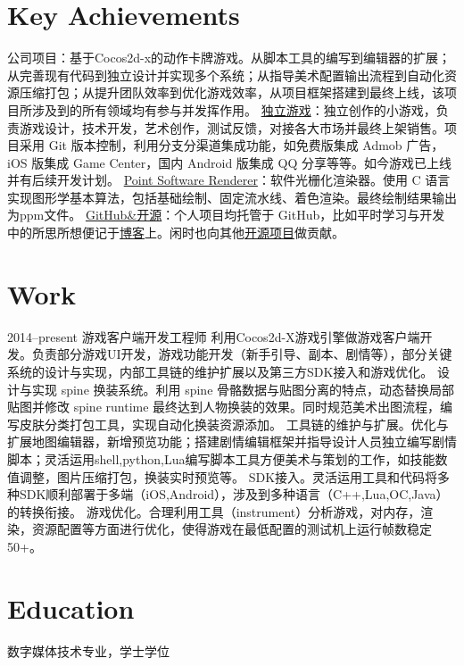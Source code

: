 \documentclass[full]{rvca}
\begin{document}
\section{Key Achievements}

\achievements
{公司项目：基于Cocos2d-x的动作卡牌游戏。从脚本工具的编写到编辑器的扩展；从完善现有代码到独立设计并实现多个系统；从指导美术配置输出流程到自动化资源压缩打包；从提升团队效率到优化游戏效率，从项目框架搭建到最终上线，该项目所涉及到的所有领域均有参与并发挥作用。}
{\href{http://a.app.qq.com/o/simple.jsp?pkgname=com.kode.Thirteen}{独立游戏}：独立创作的小游戏，负责游戏设计，技术开发，艺术创作，测试反馈，对接各大市场并最终上架销售。项目采用 Git 版本控制，利用分支分渠道集成功能，如免费版集成 Admob 广告，iOS 版集成 Game Center，国内 Android 版集成 QQ 分享等等。如今游戏已上线并有后续开发计划。}
{\href{https://github.com/keyring/point}{Point Software Renderer}：软件光栅化渲染器。使用 C 语言实现图形学基本算法，包括基础绘制、固定流水线、着色渲染。最终绘制结果输出为ppm文件。}
{\href{http://github.com/keyring}{GitHub\&开源}：个人项目均托管于 GitHub，比如平时学习与开发中的所思所想便记于\href{http://www.photoneray.com}{博客}上。闲时也向其他\href{https://github.com/cloudwu/lua53doc/graphs/contributors}{开源项目}做贡献。}
{}

\section{Work}


{2014--present}%
{游戏客户端开发工程师} %
{利用Cocos2d-X游戏引擎做游戏客户端开发。负责部分游戏UI开发，游戏功能开发（新手引导、副本、剧情等），部分关键系统的设计与实现，内部工具链的维护扩展以及第三方SDK接入和游戏优化。}%
{设计与实现 spine 换装系统。利用 spine 骨骼数据与贴图分离的特点，动态替换局部贴图并修改 spine runtime 最终达到人物换装的效果。同时规范美术出图流程，编写皮肤分类打包工具，实现自动化换装资源添加。}
{工具链的维护与扩展。优化与扩展地图编辑器，新增预览功能；搭建剧情编辑框架并指导设计人员独立编写剧情脚本；灵活运用shell,python,Lua编写脚本工具方便美术与策划的工作，如技能数值调整，图片压缩打包，换装实时预览等。}
{SDK接入。灵活运用工具和代码将多种SDK顺利部署于多端（iOS,Android），涉及到多种语言（C++,Lua,OC,Java）的转换衔接。}
{游戏优化。合理利用工具（instrument）分析游戏，对内存，渲染，资源配置等方面进行优化，使得游戏在最低配置的测试机上运行帧数稳定50+。}
{}

\section{Education}

数字媒体技术专业，学士学位
\end{document}
